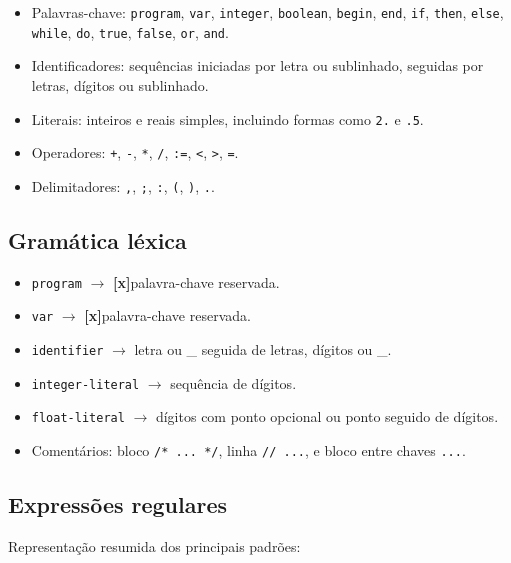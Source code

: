 \documentclass[12pt,a4paper]{article}
\newcommand{\checked}{\textbf{[x]}}
\begin{document}
\begin{itemize}[leftmargin=1.5em]
    \item Palavras-chave: \texttt{program}, \texttt{var}, \texttt{integer}, \texttt{boolean}, \texttt{begin}, \texttt{end}, \texttt{if}, \texttt{then}, \texttt{else}, \texttt{while}, \texttt{do}, \texttt{true}, \texttt{false}, \texttt{or}, \texttt{and}.
    \item Identificadores: sequências iniciadas por letra ou sublinhado, seguidas por letras, dígitos ou sublinhado.
    \item Literais: inteiros e reais simples, incluindo formas como \texttt{2.} e \texttt{.5}.
    \item Operadores: \texttt{+}, \texttt{-}, \texttt{*}, \texttt{/}, \texttt{:=}, \texttt{<}, \texttt{>}, \texttt{=}.
    \item Delimitadores: \texttt{,}, \texttt{;}, \texttt{:}, \texttt{(}, \texttt{)}, \texttt{.}.
\end{itemize}

\subsection*{Gramática léxica}

\begin{itemize}[leftmargin=1.5em]
    \item \texttt{program} \(\rightarrow\) \checked palavra-chave reservada.
    \item \texttt{var} \(\rightarrow\) \checked palavra-chave reservada.
    \item \texttt{identifier} \(\rightarrow\) letra ou \_ seguida de letras, dígitos ou \_.
    \item \texttt{integer-literal} \(\rightarrow\) sequência de dígitos.
    \item \texttt{float-literal} \(\rightarrow\) dígitos com ponto opcional ou ponto seguido de dígitos.
    \item Comentários: bloco \texttt{/* ... */}, linha \texttt{// ...}, e bloco entre chaves \texttt{{...}}.
\end{itemize}

\subsection*{Expressões regulares}

Representação resumida dos principais padrões:
\end{document}
